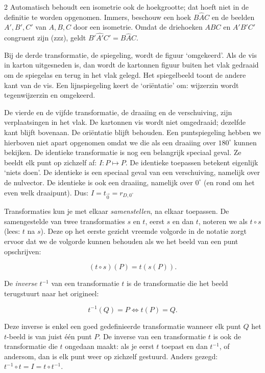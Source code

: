 \begin{multicols}{2}
    Automatisch behoudt een isometrie ook de hoekgrootte; dat hoeft niet in de definitie te worden opgenomen. Immers, beschouw een hoek $B\hat{A}C$ en de beelden $A', B', C'$ van $A, B, C$ door een isometrie. Omdat de driehoeken $ABC$ en $A'B'C'$ congruent zijn (zzz), geldt $B'\hat{A'}C'=B\hat{A}C$.
    
    Bij de derde transformatie, de spiegeling, wordt de figuur `omgekeerd'. Als de vis in karton uitgesneden is, dan wordt de kartonnen figuur buiten het vlak gedraaid om de spiegelas en terug in het vlak gelegd. Het spiegelbeeld toont de andere kant van de vis. Een lijnspiegeling keert de `oriëntatie' om: wijzerzin wordt tegenwijzerzin en omgekeerd.
    
    De vierde en de vijfde transformatie, de draaiing en de verschuiving, zijn verplaatsingen in het vlak. De kartonnen vis wordt niet omgedraaid; dezelfde kant blijft bovenaan. De oriëntatie blijft behouden. Een puntspiegeling hebben we hierboven niet apart opgenomen omdat we die als een draaiing over $180^\circ$ kunnen bekijken. De identieke transformatie is nog een belangrijk speciaal geval. Ze beeldt elk punt op zichzelf af: $I: P\mapsto P$. De identieke toepassen betekent eigenlijk `niets doen'. De identieke is een speciaal geval van een verschuiving, namelijk over de nulvector. De identieke is ook een draaiing, namelijk over $0^\circ$ (en rond om het even welk draaipunt). Dus: $I=t_{\overrightarrow{0}}=r_{D, 0^\circ}$
    	
    Transformaties kun je met elkaar \emph{samenstellen}, na elkaar toepassen. De samengestelde van twee transformaties $s$ en $t$, eerst $s$ en dan $t$, noteren we als $t\circ s$ (lees: $t$ na $s$). Deze op het eerste gezicht vreemde volgorde in de notatie zorgt ervoor dat we de volgorde kunnen behouden als we het beeld van een punt opschrijven:
    
    $$(t\circ s) (P) =t (s(P)).$$
    
    De \emph{inverse} $t^{-1}$ van een transformatie $t$ is de transformatie die het beeld terugstuurt naar het origineel:
    
    $$t^{-1}(Q)=P\Leftrightarrow t(P)=Q.$$ 
    
    Deze inverse is enkel een goed gedefinieerde transformatie wanneer elk punt $Q$ het $t$-beeld is van juist één punt $P$. De inverse van een transformatie $t$ is ook de transformatie die $t$ ongedaan maakt: als je eerst $t$ toepast en dan $t^{-1}$, of andersom, dan is elk punt weer op zichzelf gestuurd. Anders gezegd: $t^{-1}\circ t=I=t\circ t^{-1}$.
    

\end{multicols}
